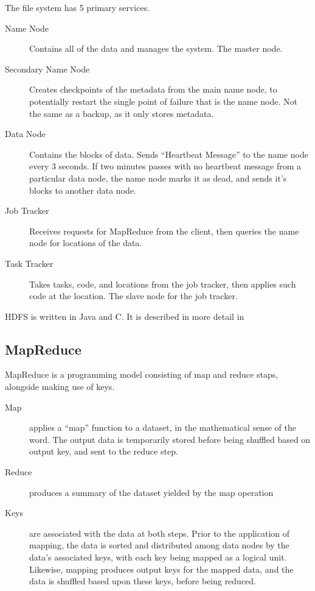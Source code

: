 \documentclass[10pt,a4paper]{article}
\begin{document}
The file system has 5 primary services.

\begin{description}
\item[Name Node] Contains all of the data and manages the system. The
  master node.
  \item[Secondary Name Node] Creates checkpoints of the metadata from
  the main name node, to potentially restart the single point of
  failure that is the name node. Not the same as a backup, as it only
  stores metadata.
\item[Data Node] Contains the blocks of data. Sends ``Heartbeat
  Message'' to the name node every 3 seconds. If two minutes passes
  with no heartbeat message from a particular data node, the name node
  marks it as dead, and sends it's blocks to another data node.
\item[Job Tracker] Receives requests for MapReduce from the client,
  then queries the name node for locations of the data.
\item[Task Tracker] Takes tasks, code, and locations from the job
  tracker, then applies such code at the location. The slave node for
  the job tracker.
\end{description}

HDFS is written in Java and C. It is described in more detail in
\textcite{shvachko2010hadoop}


\subsection{MapReduce}
\label{sec:mapreduce}

MapReduce is a programming model consisting of map and reduce staps,
alongside making use of keys.

\begin{description}
\item[Map] applies a ``map'' function to a dataset, in the
  mathematical sense of the word. The output data is temporarily
  stored before being shuffled based on output key, and sent to the
  reduce step.
\item[Reduce] produces a summary of the dataset yielded by the map operation
\item[Keys] are associated with the data at both steps. Prior to the
  application of mapping, the data is sorted and distributed among
  data nodes by the data's associated keys, with each key being mapped
  as a logical unit. Likewise, mapping produces output keys for the
  mapped data, and the data is shuffled based upon these keys, before
  being reduced.
\end{description}
\end{document}
